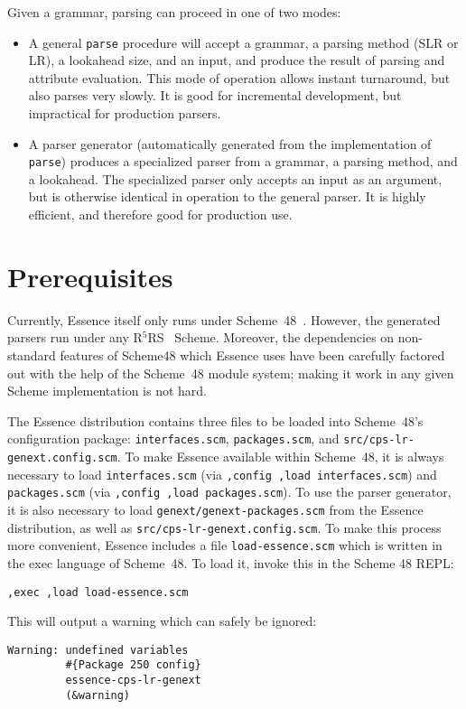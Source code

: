 \documentclass{article}
\newcommand{\codefont}[1]{\texttt{#1}}
\newcommand{\filename}[1]{\texttt{#1}}
\begin{document}
Given a grammar, parsing can proceed in one of two modes:
%
\begin{itemize}
\item A general \codefont{parse} procedure will accept a grammar, a
  parsing method (SLR or LR), a lookahead size, and an input, and
  produce the result of parsing and attribute evaluation.  This mode
  of operation allows instant turnaround, but also parses very
  slowly.  It is good for incremental development, but impractical for
  production parsers.
\item A parser generator (automatically generated from the
  implementation of \codefont{parse}) produces a specialized parser
  from a grammar, a parsing method, and a lookahead.  The specialized
  parser only accepts an input as an argument, but is otherwise
  identical in operation to the general parser.  It is highly
  efficient, and therefore good for production use.
\end{itemize}

\section{Prerequisites}
\label{sec:preliminaries}

Currently, Essence itself only runs under
Scheme~48~\cite{KelseyRees1995}.  However, the generated parsers run
under any R$^5$RS~\cite{KelseyClingerRees1998} Scheme.  Moreover, the
dependencies on non-standard features of Scheme48 which Essence uses
have been carefully factored out with the help of the Scheme~48 module
system; making it work in any given Scheme implementation is not hard.

The Essence distribution contains three files to be loaded into
Scheme~48's configuration package: \filename{interfaces.scm},
\filename{packages.scm}, and \filename{src/cps-lr-genext.config.scm}.  To
make Essence available within Scheme~48, it is always necessary to
load \filename{interfaces.scm} (via \codefont{,config ,load
  interfaces.scm}) and \filename{packages.scm}
(via \codefont{,config ,load
  packages.scm}).  To use the parser generator, it is also necessary
to load \filename{genext/genext-packages.scm} from the Essence
distribution, as well as \filename{src/cps-lr-genext.config.scm}.
To make this process more convenient, Essence includes a file
\filename{load-essence.scm} which is written in the exec language of
Scheme~48.  To load it, invoke this in the Scheme 48 REPL:
%
\begin{verbatim}
,exec ,load load-essence.scm
\end{verbatim}
%
This will output a warning which can safely be ignored:
%
\begin{verbatim}
Warning: undefined variables
         #{Package 250 config}
         essence-cps-lr-genext
         (&warning)
\end{verbatim}
\end{document}
